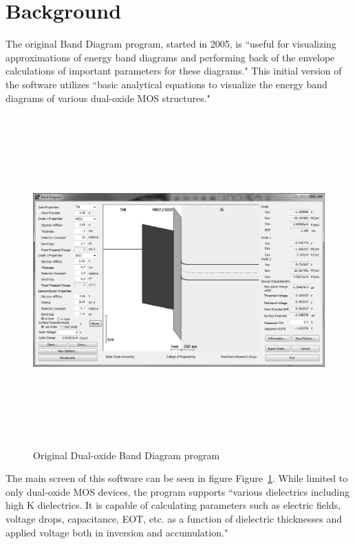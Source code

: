 \documentclass[project]{bsu-ms}
\begin{document}
\section{Background}\label{sec:background}

The original Band Diagram program, started in 2005, is ``useful for visualizing approximations of energy band diagrams and performing back of the envelope calculations of important parameters for these diagrams." \cite{band:web1} This initial version of the software utilizes ``basic analytical equations to visualize the energy band diagrams of various dual-oxide MOS structures." \cite{band:paper1} 

\begin{figure}[ht]
\begin{center}
\includegraphics*[width=6.0in,height=5.0in,keepaspectratio]{origBandProgram.eps}
\end{center}
\caption{Original Dual-oxide Band Diagram program}
\label{fig:origProg}
\end{figure}

The main screen of this software can be seen in figure Figure~\ref{fig:origProg}. While limited to only dual-oxide MOS devices, the program supports ``various dielectrics including high K dielectrics. It is capable of calculating parameters such as electric fields, voltage drops, capacitance, EOT, etc. as a function of dielectric thicknesses and applied voltage both in inversion and accumulation." \cite{band:web1}
\end{document}

